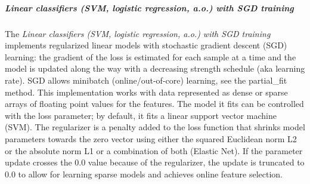 \subparagraph{Linear classifiers (SVM, logistic regression, a.o.) with SGD
training}
\mbox{}

The \textit{Linear classifiers (SVM, logistic regression, a.o.) with SGD
training} implements regularized linear models with stochastic gradient
descent (SGD) learning: the gradient of the loss is estimated for each sample at
a time and the model is updated along the way with a decreasing strength
schedule (aka learning rate).
%
SGD allows minibatch (online/out-of-core) learning, see the partial\_fit method.
%
This implementation works with data represented as dense or sparse arrays of
floating point values for the features.
%
The model it fits can be controlled with the loss parameter; by default, it fits
a linear support vector machine (SVM).
%
The regularizer is a penalty added to the loss function that shrinks model
parameters towards the zero vector using either the squared Euclidean norm L2 or
the absolute norm L1 or a combination of both (Elastic Net).
%
If the parameter update crosses the 0.0 value because of the regularizer, the
update is truncated to 0.0 to allow for learning sparse models and achieves
online feature selection.
%
